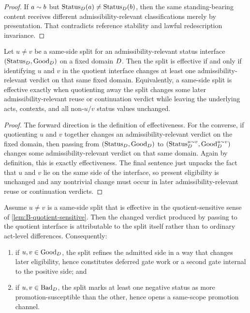 \begin{proof}
If $a\sim b$ but $\mathrm{Status}_D(a)\neq \mathrm{Status}_D(b)$, then the same standing-bearing content receives different admissibility-relevant classifications merely by presentation. That contradicts reference stability and lawful redescription invariance.
\end{proof}

\begin{lemma}
\label{lem:B-quotient-sensitive}
Let $u\neq v$ be a same-side split for an admissibility-relevant status interface $(\mathrm{Status}_D,\mathrm{Good}_D)$ on a fixed domain $D$. Then the split is effective if and only if identifying $u$ and $v$ in the quotient interface changes at least one admissibility-relevant verdict on that same fixed domain. Equivalently, a same-side split is effective exactly when quotienting away the split changes some later admissibility-relevant reuse or continuation verdict while leaving the underlying acts, contexts, and all non-$u/v$ status values unchanged.
\end{lemma}

\begin{proof}
The forward direction is the definition of effectiveness. For the converse, if quotienting $u$ and $v$ together changes an admissibility-relevant verdict on the fixed domain, then passing from $(\mathrm{Status}_D,\mathrm{Good}_D)$ to $(\mathrm{Status}^{u\sim v}_D,\mathrm{Good}^{u\sim v}_D)$ changes some admissibility-relevant verdict on that same domain. Again by definition, this is exactly effectiveness. The final sentence just unpacks the fact that $u$ and $v$ lie on the same side of the interface, so present eligibility is unchanged and any nontrivial change must occur in later admissibility-relevant reuse or continuation verdicts.
\end{proof}

\begin{lemma}
\label{lem:B-hidden-gate}
Assume $u\neq v$ is a same-side split that is effective in the quotient-sensitive sense of \cref{lem:B-quotient-sensitive}. Then the changed verdict produced by passing to the quotient interface is attributable to the split itself rather than to ordinary act-level differences. Consequently:
\begin{enumerate}[label=(\roman*), leftmargin=2.5em]
    \item if $u,v\in \mathrm{Good}_D$, the split refines the admitted side in a way that changes later eligibility, hence constitutes deferred gate work or a second gate internal to the positive side; and
    \item if $u,v\in \mathrm{Bad}_D$, the split marks at least one negative status as more promotion-susceptible than the other, hence opens a same-scope promotion channel.
\end{enumerate}
\end{lemma}

